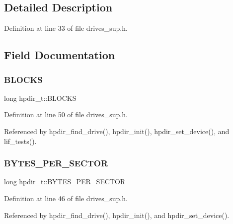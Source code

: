 \subsection{Detailed Description}


Definition at line 33 of file drives\+\_\+sup.\+h.



\subsection{Field Documentation}
\mbox{\label{structhpdir__t_a4b4f32c9b9cfe558ce5fbd51d65b5db3}} 
\subsubsection{\texorpdfstring{B\+L\+O\+C\+KS}{BLOCKS}}
{\footnotesize\ttfamily long hpdir\+\_\+t\+::\+B\+L\+O\+C\+KS}



Definition at line 50 of file drives\+\_\+sup.\+h.



Referenced by hpdir\+\_\+find\+\_\+drive(), hpdir\+\_\+init(), hpdir\+\_\+set\+\_\+device(), and lif\+\_\+tests().

\mbox{\label{structhpdir__t_a18355478edba37fb7b2b0bca2448d247}} 
\subsubsection{\texorpdfstring{B\+Y\+T\+E\+S\+\_\+\+P\+E\+R\+\_\+\+S\+E\+C\+T\+OR}{BYTES\_PER\_SECTOR}}
{\footnotesize\ttfamily long hpdir\+\_\+t\+::\+B\+Y\+T\+E\+S\+\_\+\+P\+E\+R\+\_\+\+S\+E\+C\+T\+OR}



Definition at line 46 of file drives\+\_\+sup.\+h.



Referenced by hpdir\+\_\+find\+\_\+drive(), hpdir\+\_\+init(), and hpdir\+\_\+set\+\_\+device().

